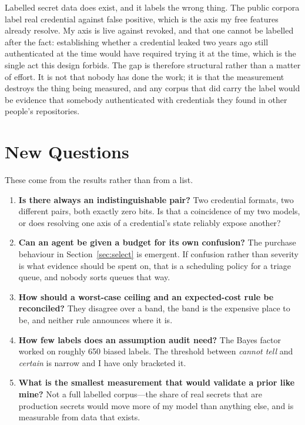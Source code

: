 \documentclass{article}
\begin{document}
Labelled secret data does exist, and it labels the wrong thing. The public
corpora label real credential against false positive, which is the axis my free
features already resolve. My axis is live against revoked, and that one cannot
be labelled after the fact: establishing whether a credential leaked two years
ago still authenticated at the time would have required trying it at the time,
which is the single act this design forbids. The gap is therefore structural
rather than a matter of effort. It is not that nobody has done the work; it is
that the measurement destroys the thing being measured, and any corpus that did
carry the label would be evidence that somebody authenticated with credentials
they found in other people's repositories.

\section{New Questions}

These come from the results rather than from a list.

\begin{enumerate}
\item \textbf{Is there always an indistinguishable pair?} Two credential formats,
two different pairs, both exactly zero bits. Is that a coincidence of my two
models, or does resolving one axis of a credential's state reliably expose
another?
\item \textbf{Can an agent be given a budget for its own confusion?} The purchase
behaviour in Section~\ref{sec:select} is emergent. If confusion rather than
severity is what evidence should be spent on, that is a scheduling policy for a
triage queue, and nobody sorts queues that way.
\item \textbf{How should a worst-case ceiling and an expected-cost rule be
reconciled?} They disagree over a band, the band is the expensive place to be,
and neither rule announces where it is.
\item \textbf{How few labels does an assumption audit need?} The Bayes factor
worked on roughly 650 biased labels. The threshold between \emph{cannot tell} and
\emph{certain} is narrow and I have only bracketed it.
\item \textbf{What is the smallest measurement that would validate a prior like
mine?} Not a full labelled corpus---the share of real secrets that are production
secrets would move more of my model than anything else, and is measurable from
data that exists.
\end{enumerate}
\end{document}
